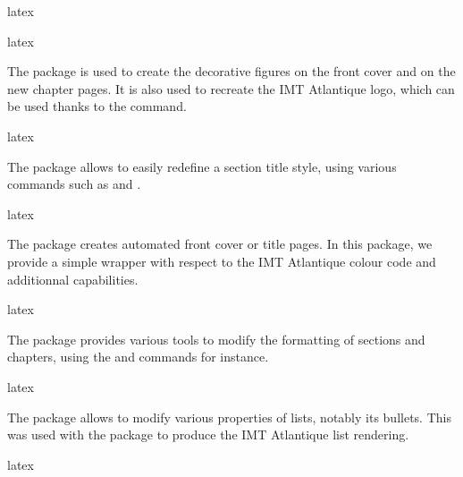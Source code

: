 \documentclass{report}
\begin{document}
\begin{imtaCode}{latex}
\end{imtaCode}


\begin{imtaCode}{latex}
\RequirePackage{fancyhdr}
\end{imtaCode}


The  package is used to create the decorative figures on the front cover and on the new chapter pages. 
It is also used to recreate the IMT Atlantique logo, which can be used thanks to the  command.

\begin{imtaCode}{latex}
\RequirePackage{tikz}
\end{imtaCode}

The  package allows to easily redefine a section title style, using various commands such as  and .

\begin{imtaCode}{latex}
\RequirePackage{titlesec}
\end{imtaCode}


The  package creates automated front cover or title pages. 
In this package, we provide a simple wrapper with respect to the IMT Atlantique colour code and additionnal capabilities.

\begin{imtaCode}{latex}
\RequirePackage{titling}
\end{imtaCode}


The  package provides various tools to modify the formatting of sections and chapters, using the  and  commands for instance.

\begin{imtaCode}{latex}
\RequirePackage{secsty}
\end{imtaCode}



The  package allows to modify various properties of lists, notably its bullets. 
This was used with the  package to produce the IMT Atlantique list rendering.

\begin{imtaCode}{latex}
\RequirePackage{enumitem}
\end{imtaCode}
\end{document}
